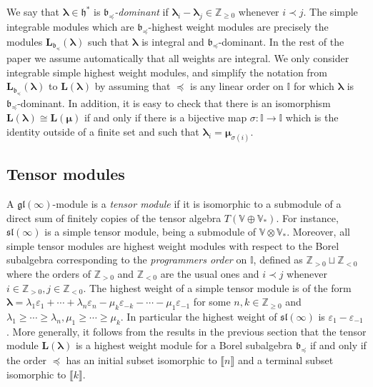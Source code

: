 \documentclass[11pt,fleqn]{amsart}
\newcommand\ZZ{\mathbb Z}
\newcommand\II{\mathbb I}
\renewcommand\to{\longrightarrow}
\renewcommand\epsilon{\varepsilon}
\theoremstyle{definition}
\theoremstyle{remark}
\theoremstyle{remark}
\newcommand\VV{\mathbb V}
\newcommand\gl{\mathfrak{gl}}
\renewcommand\sl{\mathfrak{sl}}
\newcommand\interval[1]{\llbracket{#1}\rrbracket}
\newcommand\lie[1]{\mathfrak{#1}}
\newcommand\wt[1]{\boldsymbol{#1}}
\begin{document}
We say that $\wt\lambda \in \lie h^*$ is \emph{$\lie b_{\preceq}$-dominant} if 
$\wt\lambda_i - \wt\lambda_{j} \in \ZZ_{\geq 0}$ whenever $i 
\prec j$. The simple integrable modules which are $\lie b_{\preceq}$-highest 
weight modules are precisely the modules $\mathbf L_{\lie b_{\preceq}}
(\wt\lambda)$ such that $\wt\lambda$ is integral and $\lie 
b_{\preceq}$-dominant. In the rest of the paper we assume automatically that 
all weights are integral. We only consider integrable simple highest weight 
modules, and simplify the notation from $\mathbf 
L_{\lie b_{\preceq}}(\wt\lambda)$ to $\mathbf L(\wt\lambda)$ by assuming that 
$\preceq$ is any linear order on $\II$ for which $\wt\lambda$ is $\lie 
b_{\preceq}$-dominant. In addition, it is easy to check that there is an 
isomorphism $\mathbf L(\wt\lambda) \cong \mathbf L(\wt\mu)$ if and only if 
there is a bijective map $\sigma: \II \to \II$ which is the identity outside of 
a finite set and such that $\wt\lambda_i = \wt\mu_{\sigma(i)}$.

\subsection{Tensor modules}
A $\gl(\infty)$-module is a \emph{tensor module} if it is isomorphic to
a submodule of a direct sum of finitely copies of the tensor algebra $T(\VV 
\oplus \VV_*)$. For instance, 
$\sl(\infty)$ is a simple tensor module, being a submodule of $\VV \otimes 
\VV_*$. Moreover, all simple tensor modules are highest weight modules with 
respect to the Borel subalgebra corresponding to the \emph{programmers order} 
on $\II$, defined as $\ZZ_{>0} \sqcup \ZZ_{<0}$ where the orders of 
$\ZZ_{>0}$ and $\ZZ_{<0}$ are the usual ones and $i \prec j$ whenever $i \in 
\ZZ_{>0}, j \in \ZZ_{<0}$. The highest weight of a simple tensor module 
is of the form $\wt\lambda = \lambda_1 \epsilon_1 + \cdots + 
\lambda_n \epsilon_n - \mu_{k} \epsilon_{-k} - \cdots -\mu_{1}\epsilon_{-1}$ 
for some $n,k \in \ZZ_{\geq 0}$ and $\lambda_1 \geq \cdots \geq \lambda_n, 
\mu_1 \geq \cdots \geq \mu_k$. In particular the highest weight of $\sl(\infty)$
is $\epsilon_1 - \epsilon_{-1}$ \cites{PS11b,HP22}. More generally, it follows 
from the results in the previous section that the tensor module $\mathbf 
L(\wt\lambda)$ is a highest weight module for a Borel subalgebra $\lie 
b_{\preceq}$ if and only if the order $\preceq$ has an initial subset 
isomorphic to $\interval n$ and a terminal subset isomorphic to $\interval k$.
\end{document}
